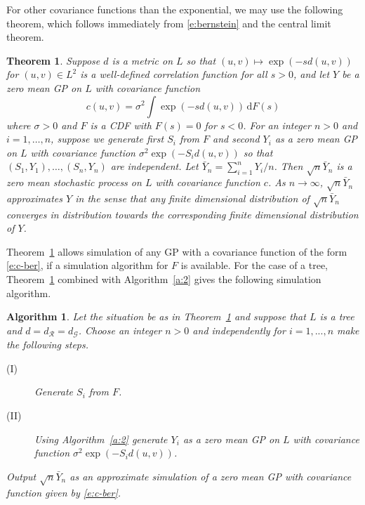 \documentclass[alpha-refs]{wiley-article}
\newtheorem{thm}{Theorem}
\newtheorem{alg}{Algorithm}
\begin{document}
For other covariance functions than the exponential, %
we may use the following theorem, which follows immediately from \eqref{e:bernstein} and the central limit theorem.

\begin{thm}\label{t:3}
Suppose $d$ is a metric on $L$ so that $(u,v)\mapsto\exp(-sd(u,v))$ for $(u,v)\in L^2$ is a well-defined correlation function for all $s>0$, and let $Y$ be a zero mean GP on $L$ with
	covariance function 
	\begin{equation}\label{e:c-ber}
	c(u,v)=\sigma^2
	\int\exp(-sd(u,v))\,\mathrm dF(s)
	\end{equation}
	where $\sigma>0$ and $F$ is a CDF with $F(s)=0$ for $s<0$. For an integer $n>0$ and $i=1,\ldots,n$, suppose we generate first $S_i$ from $F$ and second $Y_i$ as a zero mean GP on $L$ with covariance function $\sigma^2\exp(-S_i d(u,v))$ so that $(S_1,Y_1),\ldots,(S_n,Y_n)$ are independent. Let $\bar Y_n=\sum_{i=1}^n Y_i/n$. Then $\sqrt n \bar Y_n$ is a zero mean stochastic process on $L$ with covariance function $c$. As $n\rightarrow\infty$, $\sqrt n \bar Y_n$ approximates $Y$ in the sense that any finite dimensional distribution of $\sqrt n \bar Y_n$ converges in distribution towards the corresponding finite dimensional distribution of $Y$.  
\end{thm}   

Theorem~\ref{t:3} allows simulation of any GP with a covariance function of the form \eqref{e:c-ber},
if a simulation algorithm for $F$ is available. For the case of a tree, Theorem~\ref{t:3} combined with Algorithm~\ref{a:2} gives the following simulation algorithm.

\begin{alg}\label{a:3}
Let the situation be as in Theorem~\ref{t:3} and suppose that $L$ is a tree and $d=d_{\mathcal R}=d_{\mathcal G}$. 
Choose an integer $n>0$ and independently for $i=1,...,n$ make the following steps. 
\begin{description}
		\item[(I)] Generate $S_i$ from $F$.
		\item[(II)] Using Algorithm~\ref{a:2} generate $Y_i$ as a zero mean GP on $L$ with covariance function $\sigma^2\exp(-S_i d(u,v))$.
\end{description}
Output 	$\sqrt n \bar Y_n$ as an approximate simulation of 	a zero mean GP with covariance function given by \eqref{e:c-ber}.
\end{alg}
\end{document}
